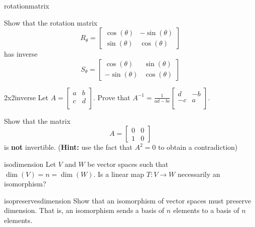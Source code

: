 \begin{problem}{rotationmatrix}
    
    Show that the rotation matrix \begin{equation*}
R_\theta = 
\begin{bmatrix}
\cos(\theta) & -\sin(\theta) \\
\sin(\theta) & \cos(\theta)
\end{bmatrix}
\end{equation*}
has inverse \begin{equation*}
S_{\theta} = 
\begin{bmatrix}
\cos(\theta) & \sin(\theta) \\
-\sin(\theta) & \cos(\theta)
\end{bmatrix}
\end{equation*}
    
\end{problem}

\begin{problem}{2x2inverse}
    Let $A = 
\begin{bmatrix}
a & b \\
c & d \\
\end{bmatrix}$.  Prove that $A^{-1} = \frac{1}{ad-bc}\begin{bmatrix}
d & -b \\
-c & a \\
\end{bmatrix}$.
\end{problem}

\begin{problem}
    Show that the matrix  \begin{equation*}
A = 
\begin{bmatrix}
0 & 0 \\
1 & 0
\end{bmatrix}
\end{equation*} is \textbf{not} invertible. (\textbf{Hint:} use the fact that $A^2 = 0$ to obtain a contradiction)
\end{problem}


\begin{problem}{isodimension}
    Let $V$ and $W$ be vector spaces such that $\dim(V) = n = \dim(W)$.  Is a linear map $T: V \to W$ necessarily an isomorphism?
\end{problem}

\begin{problem}{isopreservesdimension}
    Show that an isomorphism of vector spaces must preserve dimension.  That is, an isomorphism sends a basis of $n$ elements to a basis of $n$ elements.
\end{problem}

